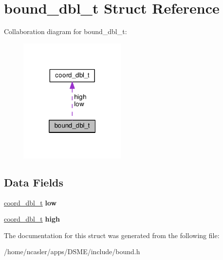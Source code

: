 \hypertarget{structbound__dbl__t}{}\section{bound\+\_\+dbl\+\_\+t Struct Reference}
\label{structbound__dbl__t}


Collaboration diagram for bound\+\_\+dbl\+\_\+t\+:\nopagebreak
\begin{figure}[H]
\begin{center}
\leavevmode
\includegraphics[width=151pt]{d3/daa/structbound__dbl__t__coll__graph}
\end{center}
\end{figure}
\subsection*{Data Fields}
\begin{DoxyCompactItemize}
\item 
\hypertarget{structbound__dbl__t_a77041a08ad4f3d41d695b3f551628561}{}\hyperlink{structcoord__dbl__t}{coord\+\_\+dbl\+\_\+t} {\bfseries low}\label{structbound__dbl__t_a77041a08ad4f3d41d695b3f551628561}

\item 
\hypertarget{structbound__dbl__t_ad4bbe9a305f3911a08647b03ec945195}{}\hyperlink{structcoord__dbl__t}{coord\+\_\+dbl\+\_\+t} {\bfseries high}\label{structbound__dbl__t_ad4bbe9a305f3911a08647b03ec945195}

\end{DoxyCompactItemize}


The documentation for this struct was generated from the following file\+:\begin{DoxyCompactItemize}
\item 
/home/ncasler/apps/\+D\+S\+M\+E/include/bound.\+h\end{DoxyCompactItemize}
